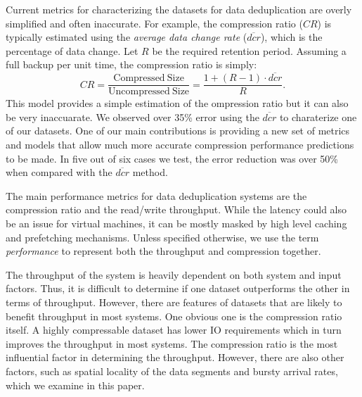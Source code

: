 Current metrics for characterizing the datasets for data deduplication are overly simplified and often inaccurate. For example, the compression ratio ($\mathit{CR}$) is typically estimated using the \emph{average data change rate} ($\overline{\mathit{dcr}}$), which is the percentage of data change. Let $R$ be the required retention period. Assuming a full backup per unit time, the compression ratio is simply:
\begin{equation}\label{dcr_est}
\mathit{CR}= \frac{\mathrm{Compressed\ Size}}{\mathrm{Uncompressed\ Size}}=\frac{1+(R-1)\cdot \overline{\mathit{dcr}}}{R}.
\end{equation}
This model provides a simple estimation of the ompression ratio but it can also be very inaccuarate. We observed over 35\% error using the $\overline{\mathit{dcr}}$ to charaterize one of our datasets. One of our main contributions is providing a new set of metrics and models that allow much more accurate compression performance predictions to be made. In five out of six cases we test, the error reduction was over 50\% when compared with the $\overline{\mathit{dcr}}$ method.

The main performance metrics for data deduplication systems are the compression ratio and the read/write throughput. While the latency could also be an issue for virtual machines, it can be mostly masked by high level caching and prefetching mechanisms. Unless specified otherwise, we use the term \emph{performance} to represent both the throughput and compression together.

The throughput of the system is heavily dependent on both system and input factors. Thus, it is difficult to determine if one dataset outperforms the other in terms of throughput. However, there are features of datasets that are likely to benefit throughput in most systems. One obvious one is the compression ratio itself. A highly compressable dataset has lower IO requirements which in turn improves the throughput in most systems. The compression ratio is the most influential factor in determining the throughput. However, there are also other factors, such as spatial locality of the data segments and bursty arrival rates, which we examine in this paper.
